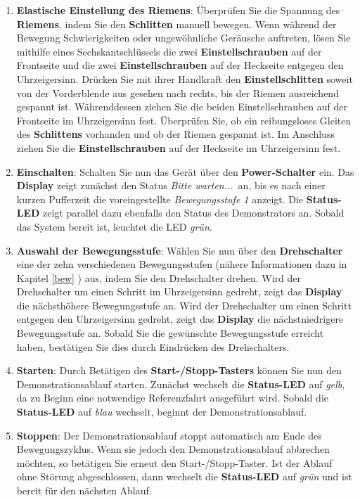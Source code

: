 \begin{enumerate} \label{STU}

	\item \textbf{Elastische Einstellung des Riemens}: Überprüfen Sie die Spannung des \textbf{Riemens}, indem Sie den \textbf{Schlitten} manuell bewegen. Wenn während der Bewegung Schwierigkeiten oder ungewöhnliche Geräusche auftreten, lösen Sie mithilfe eines Sechskantschlüssels die zwei \textbf{Einstellschrauben} auf der Frontseite und die zwei \textbf{Einstellschrauben} auf der Heckseite entgegen den Uhrzeigersinn. Drücken Sie mit ihrer Handkraft den \textbf{Einstellschlitten} soweit von der Vorderblende aus gesehen nach rechts, bis der Riemen ausreichend gespannt ist. Währenddessen ziehen Sie die beiden Einstellschrauben auf der Frontseite im Uhrzeigersinn fest. Überprüfen Sie, ob ein reibungsloses Gleiten des \textbf{Schlittens} vorhanden und ob der Riemen gespannt ist. Im Anschluss ziehen Sie die \textbf{Einstellschrauben} auf der Heckseite im Uhrzeigersinn fest. 
	
	\item \textbf{Einschalten}: Schalten Sie nun das Gerät über den \textbf{Power-Schalter} ein. Das \textbf{Display} zeigt zunächst den Status \glqq \textit{Bitte warten...}\grqq \ an, bis es nach einer kurzen Pufferzeit die voreingestellte \textit{\glqq Bewegungsstufe 1\grqq} anzeigt.
	Die \textbf{Status-LED} zeigt parallel dazu ebenfalls den Status des Demonstrators an. Sobald das System bereit ist, leuchtet die LED \textit{grün}.
	
	\item \textbf{Auswahl der Bewegungsstufe}: Wählen Sie nun über den \textbf{Drehschalter} eine der zehn verschiedenen Bewegungsstufen (nähere Informationen dazu in Kapitel \ref{bew} ) aus, indem Sie den Drehschalter drehen. Wird der Drehschalter um einen Schritt im Uhrzeigersinn gedreht, zeigt das \textbf{Display} die nächsthöhere Bewegungsstufe an. Wird der Drehschalter um einen Schritt entgegen den Uhrzeigersinn gedreht, zeigt das \textbf{Display} die nächstniedrigere Bewegungsstufe an. Sobald Sie die gewünschte Bewegungsstufe erreicht haben, bestätigen Sie dies durch Eindrücken des Drehschalters.	
	
	\item \textbf{Starten}: Durch Betätigen des \textbf{Start-/Stopp-Tasters} können Sie nun den Demonstrationsablauf starten. Zunächst wechselt die \textbf{Status-LED} auf \textit{gelb}, da zu Beginn eine notwendige Referenzfahrt ausgeführt wird. Sobald die \textbf{Status-LED} auf \textit{blau} wechselt, beginnt der Demonstrationsablauf.
	
	\item \textbf{Stoppen}: Der Demonstrationsablauf stoppt automatisch am Ende des Bewegungszyklus. Wenn sie jedoch den Demonstrationsablauf abbrechen möchten, so betätigen Sie erneut den Start-/Stopp-Taster. Ist der Ablauf ohne Störung abgeschlossen, dann wechselt die \textbf{Status-LED} auf \textit{grün} und ist bereit für den nächsten Ablauf.
\end{enumerate}

